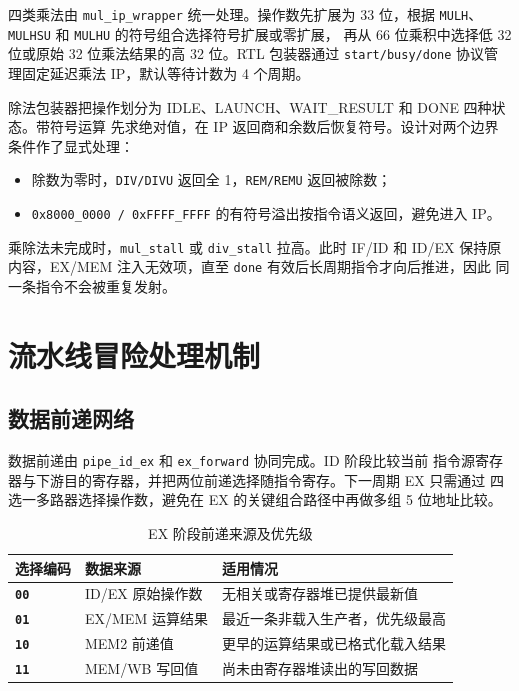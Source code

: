 \documentclass[UTF8,zihao=-4,a4paper]{ctexart}
\numberwithin{table}{section}
\numberwithin{figure}{section}
\newcommand{\code}[1]{\texttt{#1}}
\begin{document}
四类乘法由 \code{mul\_ip\_wrapper} 统一处理。操作数先扩展为 33 位，根据
\code{MULH}、\code{MULHSU} 和 \code{MULHU} 的符号组合选择符号扩展或零扩展，
再从 66 位乘积中选择低 32 位或原始 32 位乘法结果的高 32 位。RTL 包装器通过
\code{start/busy/done} 协议管理固定延迟乘法 IP，默认等待计数为 4 个周期。

除法包装器把操作划分为 IDLE、LAUNCH、WAIT\_RESULT 和 DONE 四种状态。带符号运算
先求绝对值，在 IP 返回商和余数后恢复符号。设计对两个边界条件作了显式处理：

\begin{itemize}
  \item 除数为零时，\code{DIV/DIVU} 返回全 1，\code{REM/REMU} 返回被除数；
  \item \code{0x8000\_0000 / 0xFFFF\_FFFF} 的有符号溢出按指令语义返回，避免进入 IP。
\end{itemize}

乘除法未完成时，\code{mul\_stall} 或 \code{div\_stall} 拉高。此时 IF/ID 和 ID/EX
保持原内容，EX/MEM 注入无效项，直至 \code{done} 有效后长周期指令才向后推进，因此
同一条指令不会被重复发射。

\section{流水线冒险处理机制}

\subsection{数据前递网络}

数据前递由 \code{pipe\_id\_ex} 和 \code{ex\_forward} 协同完成。ID 阶段比较当前
指令源寄存器与下游目的寄存器，并把两位前递选择随指令寄存。下一周期 EX 只需通过
四选一多路器选择操作数，避免在 EX 的关键组合路径中再做多组 5 位地址比较。

\begin{table}[H]
  \centering
  \caption{EX 阶段前递来源及优先级}
  \label{tab:forwarding}
  \begin{tabularx}{\textwidth}{>{\bfseries}p{2.2cm}p{3.2cm}X}
    \toprule
    选择编码 & 数据来源 & 适用情况 \\
    \midrule
    \code{00} & ID/EX 原始操作数 & 无相关或寄存器堆已提供最新值 \\
    \code{01} & EX/MEM 运算结果 & 最近一条非载入生产者，优先级最高 \\
    \code{10} & MEM2 前递值 & 更早的运算结果或已格式化载入结果 \\
    \code{11} & MEM/WB 写回值 & 尚未由寄存器堆读出的写回数据 \\
    \bottomrule
  \end{tabularx}
\end{table}
\end{document}
